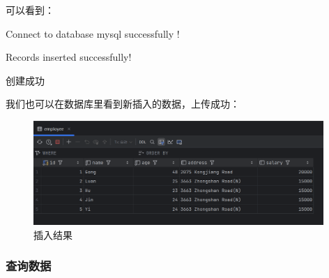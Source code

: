 \documentclass{article}
\begin{document}
	可以看到：
	
	Connect to database mysql successfully !
	
	Records inserted successfully!
	
	创建成功
	
	我们也可以在数据库里看到新插入的数据，上传成功：
	
	\begin{figure}[H]
		\centering
		\includegraphics[width=11cm]{./images/9.插入结果.png}
		\caption{插入结果}
	\end{figure}
	
	\subsubsection{查询数据}
	
\end{document}
